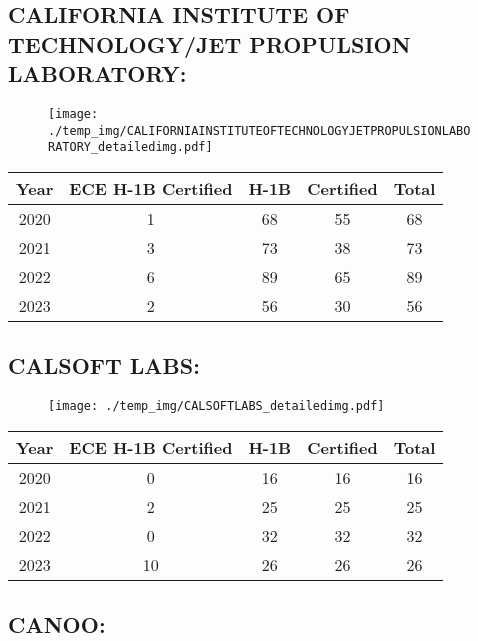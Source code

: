 \documentclass{article}%
\begin{document}
%
\newpage%
\subsection{CALIFORNIA INSTITUTE OF TECHNOLOGY/JET PROPULSION LABORATORY:}%
\label{subsec:CALIFORNIAINSTITUTEOFTECHNOLOGY/JETPROPULSIONLABORATORY}%
\label{CALIFORNIAINSTITUTEOFTECHNOLOGYJETPROPULSIONLABORATORYdetailed}%


\begin{figure}[htbp]%
\centering%
\texttt{[image: ./temp\_img/CALIFORNIAINSTITUTEOFTECHNOLOGYJETPROPULSIONLABORATORY\_detailedimg.pdf]}%
\end{figure}

%
\begin{longtable}{c|c|c|c|c}%
\hline%
Year&ECE H{-}1B Certified&H{-}1B&Certified&Total\\%
\hline%
2020&1&68&55&68\\%
\hline%
2021&3&73&38&73\\%
\hline%
2022&6&89&65&89\\%
\hline%
2023&2&56&30&56\\%
\hline%
\end{longtable}

%
\newpage%
\subsection{CALSOFT LABS:}%
\label{subsec:CALSOFTLABS}%
\label{CALSOFTLABSdetailed}%


\begin{figure}[htbp]%
\centering%
\texttt{[image: ./temp\_img/CALSOFTLABS\_detailedimg.pdf]}%
\end{figure}

%
\begin{longtable}{c|c|c|c|c}%
\hline%
Year&ECE H{-}1B Certified&H{-}1B&Certified&Total\\%
\hline%
2020&0&16&16&16\\%
\hline%
2021&2&25&25&25\\%
\hline%
2022&0&32&32&32\\%
\hline%
2023&10&26&26&26\\%
\hline%
\end{longtable}

%
\newpage%
\subsection{CANOO:}%
\label{subsec:CANOO}%
\label{CANOOdetailed}%
\end{document}
